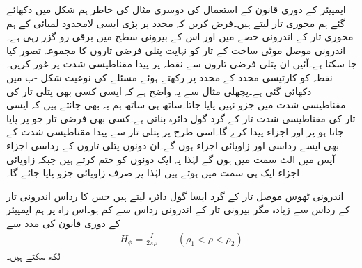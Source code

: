 ایمپیئر کے دوری قانون  کے استعمال کی دوسری مثال کی خاطر ہم شکل  میں دکھائے گئے ہم محوری تار لیتے ہیں۔فرض کریں کہ  محدد پر پڑی  ایسی لامحدود لمبائی کے ہم محوری  تار کے اندرونی حصے میں  اور اس کے بیرونی سطح میں  برقی رو گزر رہی ہے۔اندرونی موصل موٹی ساخت کے تار کو نہایت پتلی فرضی تاروں کا مجموعہ تصور کیا جا سکتا ہے۔آئیں ان پتلی فرضی تاروں سے نقطہ  پر پیدا مقناطیسی شدت پر غور کریں۔نقطہ  کو کارتیسی محدد کے  محدد پر رکھتے ہوئے مسئلے کی نوعیت شکل -ب میں دکھائی گئی ہے۔پچھلی مثال سے یہ واضح ہے کہ ایسی کسی بھی پتلی تار کی مقناطیسی شدت میں  جزو نہیں پایا جاتا۔ساتھ ہی ساتھ ہم یہ بھی جانتے ہیں کہ ایسی تار کی مقناطیسی شدت تار کے گرد گول دائرہ بناتی ہے۔کسی بھی فرضی تار جو  پر پایا جاتا ہو  پر   اور  اجزاء پیدا کرے گا۔اسی طرح  پر پتلی تار سے پیدا مقناطیسی شدت کے بھی ایسے رداسی اور زاویائی اجزاء ہوں گے۔ان دونوں پتلی تاروں کے رداسی اجزاء آپس میں الٹ سمت میں ہوں گے لہٰذا یہ ایک دونوں کو ختم کرتے ہیں جبکہ زاویائی اجزاء ایک ہی سمت میں ہوتے ہیں لہٰذا  پر صرف زاویائی جزو پایا جائے گا۔

اندرونی ٹھوس موصل تار کے گرد ایسا گول دائرہ لیتے ہیں جس کا رداس  اندرونی تار کے رداس  سے زیادہ مگر بیرونی تار کے اندرونی رداس  سے کم ہو۔اس راہ پر ہم ایمپیئر کے دوری قانون کی مدد سے
\begin{align}\label{مساوات_مقناطیسی_ہم_محوری_تاروں_کے_درمیان_شدت}
H_{\phi}=\frac{I}{2\pi \rho} \quad \quad (\rho_1 < \rho <\rho_2)
\end{align}
لکھ سکتے ہیں۔

